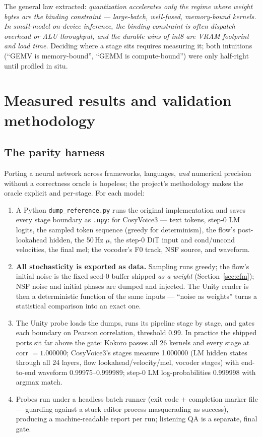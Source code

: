 \documentclass[11pt,a4paper]{article}
\newcommand{\code}[1]{\texttt{#1}}
\begin{document}
The general law extracted: \emph{quantization accelerates only the regime where weight
bytes are the binding constraint --- large-batch, well-fused, memory-bound kernels. In
small-model on-device inference, the binding constraint is often dispatch overhead or
ALU throughput, and the durable wins of int8 are VRAM footprint and load time.} Deciding
where a stage sits requires measuring it; both intuitions (``GEMV is memory-bound'',
``GEMM is compute-bound'') were only half-right until profiled in situ.

\section{Measured results and validation methodology}
\label{sec:results}

\subsection{The parity harness}
\label{sec:parity}

Porting a neural network across frameworks, languages, \emph{and} numerical precision
without a correctness oracle is hopeless; the project's methodology makes the oracle
explicit and per-stage. For each model:

\begin{enumerate}[leftmargin=2em]
\item A Python \code{dump\_reference.py} runs the original implementation and saves
every stage boundary as \code{.npy}: for CosyVoice3 --- text tokens, step-0 LM logits,
the sampled token sequence (greedy for determinism), the flow's post-lookahead hidden,
the 50\,Hz $\mu$, the step-0 DiT input and cond/uncond velocities, the final mel; the
vocoder's F0 track, NSF source, and waveform.
\item \textbf{All stochasticity is exported as data.} Sampling runs greedy; the flow's
initial noise is the fixed seed-0 buffer shipped \emph{as a weight}
(Section~\ref{sec:cfm}); NSF noise and initial phases are dumped and injected. The
Unity render is then a deterministic function of the same inputs --- ``noise as
weights'' turns a statistical comparison into an exact one.
\item The Unity probe loads the dumps, runs its pipeline stage by stage, and gates each
boundary on Pearson correlation, threshold 0.99. In practice the shipped ports sit far
above the gate: Kokoro passes all 26 kernels and every stage at corr $= 1.000000$;
CosyVoice3's stages measure 1.000000 (LM hidden states through all 24 layers, flow
lookahead/velocity/mel, vocoder stages) with end-to-end waveform 0.99975--0.999989;
step-0 LM log-probabilities 0.999998 with argmax match.
\item Probes run under a headless batch runner (exit code $+$ completion marker file
--- guarding against a stuck editor process masquerading as success), producing a
machine-readable report per run; listening QA is a separate, final gate.
\end{enumerate}
\end{document}
